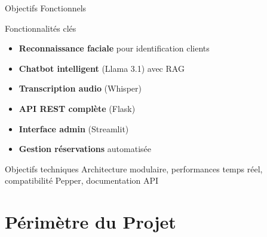 \documentclass[aspectratio=169,11pt]{beamer}
\begin{document}
\begin{frame}{Objectifs Fonctionnels}
\begin{block}{Fonctionnalités clés}
\begin{itemize}
    \item[\textcolor{primaryblue}{\faUser}] \textbf{Reconnaissance faciale} pour identification clients
    \item[\textcolor{primaryblue}{\faComments}] \textbf{Chatbot intelligent} (Llama 3.1) avec RAG
    \item[\textcolor{primaryblue}{\faMicrophone}] \textbf{Transcription audio} (Whisper)
    \item[\textcolor{primaryblue}{\faDatabase}] \textbf{API REST complète} (Flask)
    \item[\textcolor{primaryblue}{\faDesktop}] \textbf{Interface admin} (Streamlit)
    \item[\textcolor{primaryblue}{\faBed}] \textbf{Gestion réservations} automatisée
\end{itemize}
\end{block}

\begin{alertblock}{Objectifs techniques}
Architecture modulaire, performances temps réel, compatibilité Pepper, documentation API
\end{alertblock}
\end{frame}


\section{Périmètre du Projet}
\end{document}
